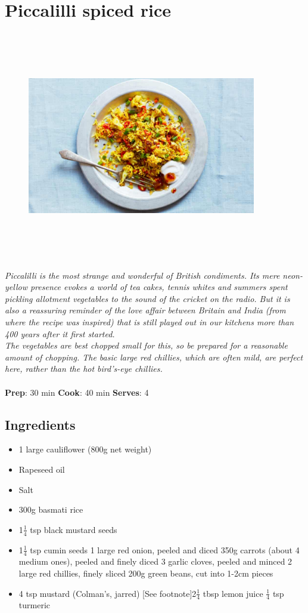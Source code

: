 \documentclass{book}
\begin{document}
\section{Piccalilli spiced rice}
\begin{figure}
\centering\includegraphics[width=10cm,height=10cm,keepaspectratio]{Recipe_Pictures/Piccalilli_spiced_rice.png}
\end{figure}
\emph{Piccalilli is the most strange and wonderful of British condiments. Its mere neon-yellow presence evokes a world of tea cakes, tennis whites and summers spent pickling allotment vegetables to the sound of the cricket on the radio. But it is also a reassuring reminder of the love affair between Britain and India (from where the recipe was inspired) that is still played out in our kitchens more than 400 years after it first started.\\ 
The vegetables are best chopped small for this, so be prepared for a reasonable amount of chopping. The basic large red chillies, which are often mild, are perfect here, rather than the hot bird’s-eye chillies.}\\\\ 
\textbf{Prep}: 30 min
\textbf{Cook}: 40 min
\textbf{Serves}: 4
\subsection*{Ingredients}
\begin{itemize}
\item 1 large cauliflower (800g net weight)
\item Rapeseed oil 
\item Salt
\item 300g basmati rice 
\item 1$\frac{1}{4}$ tsp black mustard seeds 
\item 1$\frac{1}{4}$ tsp cumin seeds 1 large red onion, peeled and diced 350g carrots (about 4 medium ones), peeled and finely diced 3 garlic cloves, peeled and minced 2 large red chillies, finely sliced 200g green beans, cut into 1-2cm pieces 
\item 4 tsp mustard (Colman’s, jarred) [See footnote]2$\frac{1}{4}$ tbsp lemon juice $\frac{1}{4}$ tsp turmeric
\end{itemize}
\end{document}
